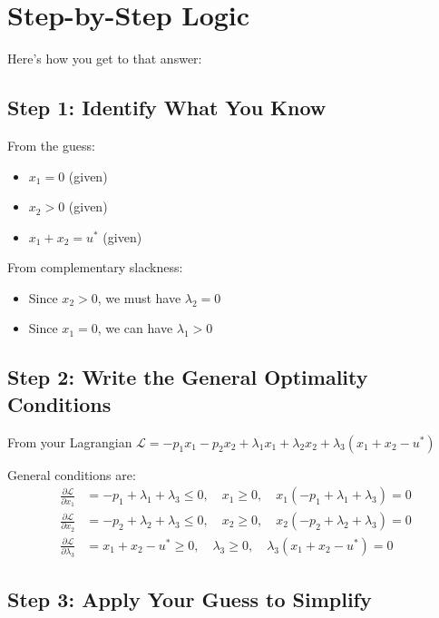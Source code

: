 \documentclass[11pt]{article}
\begin{document}
\section{Step-by-Step Logic}

Here's how you get to that answer:

\subsection{Step 1: Identify What You Know}

From the guess:
\begin{itemize}
\item $x_1 = 0$ (given)
\item $x_2 > 0$ (given)
\item $x_1 + x_2 = u^*$ (given)
\end{itemize}

From complementary slackness:
\begin{itemize}
\item Since $x_2 > 0$, we must have $\lambda_2 = 0$
\item Since $x_1 = 0$, we can have $\lambda_1 > 0$
\end{itemize}

\subsection{Step 2: Write the General Optimality Conditions}

From your Lagrangian $\mathcal{L} = -p_1 x_1 - p_2 x_2 + \lambda_1 x_1 + \lambda_2 x_2 + \lambda_3(x_1 + x_2 - u^*)$

General conditions are:
\begin{align}
\frac{\partial \mathcal{L}}{\partial x_1} &= -p_1 + \lambda_1 + \lambda_3 \leq 0, \quad x_1 \geq 0, \quad x_1(-p_1 + \lambda_1 + \lambda_3) = 0 \\
\frac{\partial \mathcal{L}}{\partial x_2} &= -p_2 + \lambda_2 + \lambda_3 \leq 0, \quad x_2 \geq 0, \quad x_2(-p_2 + \lambda_2 + \lambda_3) = 0 \\
\frac{\partial \mathcal{L}}{\partial \lambda_3} &= x_1 + x_2 - u^* \geq 0, \quad \lambda_3 \geq 0, \quad \lambda_3(x_1 + x_2 - u^*) = 0
\end{align}

\subsection{Step 3: Apply Your Guess to Simplify}
\end{document}
